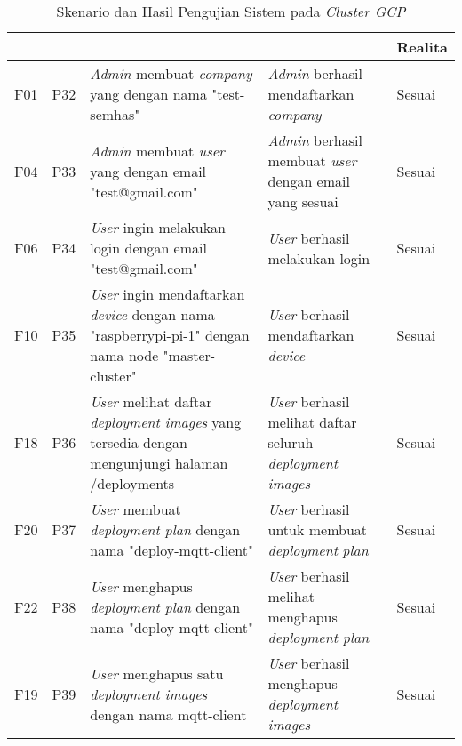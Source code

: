 \bgroup
\begin{table}[ht]
  \def\arraystretch{1.3}
  \caption{Skenario dan Hasil Pengujian Sistem pada \textit{Cluster GCP}}
  \label{tab:pengujian-sistem-gcp}
  \centering
  \begin{tabular}{|p{2cm}|p{2cm}|p{3cm}|p{3cm}|p{1.5cm}|}
    \hline
    \centering{ID Fungsional} & \centering{ID Pengujian} & \centering{Skenario}                                                                                              & \centering{Ekspektasi}                                                   & Realita \\
    \hline
    F01                       & P32                      & \textit{Admin} membuat \textit{company} yang dengan nama "test-semhas"                                            & \textit{Admin} berhasil mendaftarkan \textit{company}                    & Sesuai  \\
    \hline
    F04                       & P33                      & \textit{Admin} membuat \textit{user} yang dengan email  "test@gmail.com"                                          & \textit{Admin} berhasil membuat \textit{user} dengan email yang sesuai   & Sesuai  \\
    \hline
    F06                       & P34                      & \textit{User} ingin melakukan login dengan email  "test@gmail.com"                                                & \textit{User} berhasil melakukan login                                   & Sesuai  \\
    \hline
    F10                       & P35                      & \textit{User} ingin mendaftarkan \textit{device} dengan nama "raspberrypi-pi-1" dengan nama node "master-cluster" & \textit{User} berhasil mendaftarkan \textit{device}                      & Sesuai  \\
    \hline
    F18                       & P36                      & \textit{User} melihat daftar  \textit{deployment images} yang tersedia dengan mengunjungi halaman /deployments    & \textit{User} berhasil melihat daftar seluruh \textit{deployment images} & Sesuai  \\
    \hline
    F20                       & P37                      & \textit{User} membuat \textit{deployment plan} dengan nama "deploy-mqtt-client"                                   & \textit{User} berhasil untuk membuat \textit{deployment} \textit{plan}   & Sesuai  \\
    \hline
    F22                       & P38                      & \textit{User} menghapus \textit{deployment plan} dengan nama "deploy-mqtt-client"                                 & \textit{User} berhasil melihat menghapus \textit{deployment plan}        & Sesuai  \\
    \hline
    F19                       & P39                      & \textit{User} menghapus satu \textit{deployment images} dengan nama mqtt-client                                   & \textit{User} berhasil menghapus \textit{deployment images}              & Sesuai  \\
    \hline
  \end{tabular}
\end{table}
\egroup

